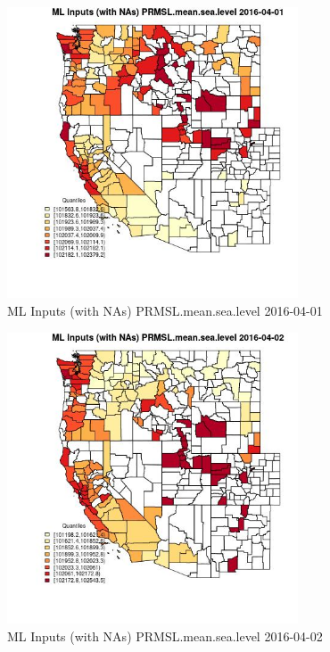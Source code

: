 \begin{figure} 
\centering  
\includegraphics[width=0.77\textwidth]{Code_Outputs/Report_ML_input_PM25_Step4_part_e_de_duplicated_aveswNAs_CountyPRMSLmeansealevelMean2016-04-01_2016-04-01.jpg} 
\caption{\label{fig:Report_ML_input_PM25_Step4_part_e_de_duplicated_aveswNAsCountyPRMSLmeansealevelMean2016-04-01_2016-04-01}ML Inputs (with NAs) PRMSL.mean.sea.level 2016-04-01} 
\end{figure} 
 

\begin{figure} 
\centering  
\includegraphics[width=0.77\textwidth]{Code_Outputs/Report_ML_input_PM25_Step4_part_e_de_duplicated_aveswNAs_CountyPRMSLmeansealevelMean2016-04-02_2016-04-02.jpg} 
\caption{\label{fig:Report_ML_input_PM25_Step4_part_e_de_duplicated_aveswNAsCountyPRMSLmeansealevelMean2016-04-02_2016-04-02}ML Inputs (with NAs) PRMSL.mean.sea.level 2016-04-02} 
\end{figure} 
 


